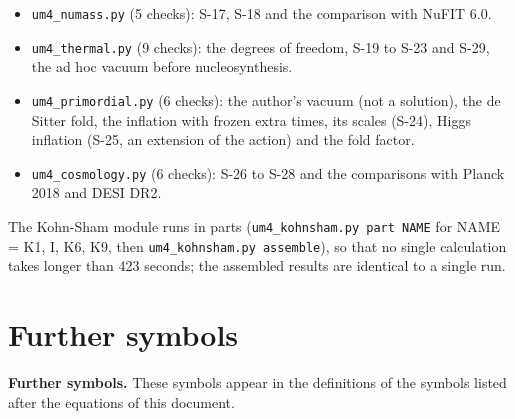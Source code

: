 \documentclass[
  10pt,
]{article}
\begin{document}
\begin{itemize}
  \texttt{um4\_flavour.py} (4 checks): S-13 to S-16.
\item
  \texttt{um4\_numass.py} (5 checks): S-17, S-18 and the comparison with
  NuFIT 6.0.
\item
  \texttt{um4\_thermal.py} (9 checks): the degrees of freedom, S-19 to
  S-23 and S-29, the ad hoc vacuum before nucleosynthesis.
\item
  \texttt{um4\_primordial.py} (6 checks): the author's vacuum (not a
  solution), the de Sitter fold, the inflation with frozen extra times,
  its scales (S-24), Higgs inflation (S-25, an extension of the action)
  and the fold factor.
\item
  \texttt{um4\_cosmology.py} (6 checks): S-26 to S-28 and the
  comparisons with Planck 2018 and DESI DR2.
\end{itemize}

The Kohn-Sham module runs in parts
(\texttt{um4\_kohnsham.py\ part\ NAME} for NAME = K1, I, K6, K9, then
\texttt{um4\_kohnsham.py\ assemble}), so that no single calculation
takes longer than 423 seconds; the assembled results are identical to a
single run.

\hypertarget{further-symbols}{%
\section{Further symbols}\label{further-symbols}}

\textbf{Further symbols.} These symbols appear in the definitions of the
symbols listed after the equations of this document.
\end{document}

